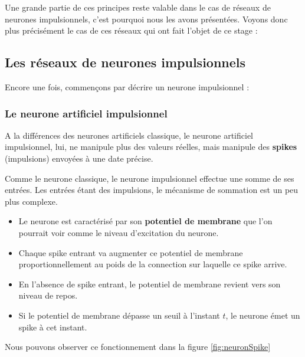 Une grande partie de ces principes reste valable dans le cas de réseaux
de neurones impulsionnels, c'est pourquoi nous les avons présentées.
Voyons donc plus précisément le cas de ces réseaux qui ont fait l'objet
de ce stage :

\hypertarget{les-ruxe9seaux-de-neurones-impulsionnels}{%
\subsection{Les réseaux de neurones
impulsionnels}\label{les-ruxe9seaux-de-neurones-impulsionnels}}

Encore une fois, commençons par décrire un neurone impulsionnel :

\hypertarget{le-neurone-artificiel-impulsionnel}{%
\subsubsection{Le neurone artificiel
impulsionnel}\label{le-neurone-artificiel-impulsionnel}}

A la différences des neurones artificiels classique, le neurone
artificiel impulsionnel, lui, ne manipule plus des valeurs réelles, mais
manipule des \textbf{spikes} (impulsions) envoyées à une date précise.

Comme le neurone classique, le neurone impulsionnel effectue une somme
de ses entrées. Les entrées étant des impulsions, le mécanisme de
sommation est un peu plus complexe.

\begin{itemize}
\tightlist
\item
  Le neurone est caractérisé par son \textbf{potentiel de membrane} que
  l'on pourrait voir comme le niveau d'excitation du neurone.
\item
  Chaque spike entrant va augmenter ce potentiel de membrane
  proportionnellement au poids de la connection sur laquelle ce spike
  arrive.
\item
  En l'absence de spike entrant, le potentiel de membrane revient vers
  son niveau de repos.
\item
  Si le potentiel de membrane dépasse un seuil à l'instant \(t\), le
  neurone émet un spike à cet instant.
\end{itemize}

Nous pouvons observer ce fonctionnement dans la figure
\ref{fig:neuronSpike}

